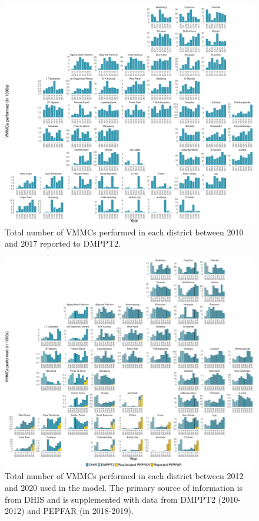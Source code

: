 \documentclass{article}
\begin{document}
\begin{appendix}

\begin{figure}[H]
	\centering
	\includegraphics[width = \linewidth]{Figures/suppmat/IDA/NumMMC_DMPPT2_District.pdf}
	\caption{Total number of VMMCs performed in each district between 2010 and 2017 reported to DMPPT2.}
\end{figure}


\begin{figure}[H]
	\centering
	\includegraphics[width = \linewidth]{Figures/suppmat/IDA/NumMMC_Model_District}
	\caption{Total number of VMMCs performed in each district between 2012 and 2020 used in the model. The primary source of information is from DHIS and is supplemented with data from DMPPT2 (2010-2012) and PEPFAR (in 2018-2019).}
\end{figure}


\end{appendix}
\end{document}
